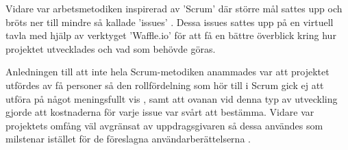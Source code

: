         Vidare var arbetsmetodiken inspirerad av 'Scrum' där större mål sattes upp och bröts ner till mindre så kallade 'issues' \cite[kap.~8]{scrum}. Dessa issues sattes upp på en virtuell tavla med hjälp av verktyget 'Waffle.io' för att få en bättre överblick kring hur projektet utvecklades och vad som behövde göras. \bigskip

        Anledningen till att inte hela Scrum-metodiken anammades var att projektet utfördes av få personer så den rollfördelning som hör till i Scrum gick ej att utföra på något meningsfullt vis \cite[kap.~6]{scrum}, samt att ovanan vid denna typ av utveckling gjorde att kostnaderna för varje issue var svårt att bestämma. Vidare var projektets omfång väl avgränsat av uppdrags\-givaren så dessa användes som milstenar istället för de föreslagna användarberättelserna \cite[kap.~9]{scrum}. 

